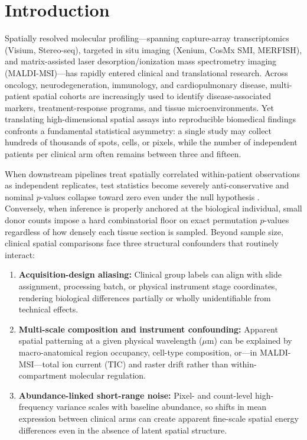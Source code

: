 \documentclass[11pt]{article}
\begin{document}
\section{Introduction}
Spatially resolved molecular profiling---spanning capture-array transcriptomics (Visium, Stereo-seq), targeted in situ imaging (Xenium, CosMx SMI, MERFISH), and matrix-assisted laser desorption/ionization mass spectrometry imaging (MALDI-MSI)---has rapidly entered clinical and translational research. Across oncology, neurodegeneration, immunology, and cardiopulmonary disease, multi-patient spatial cohorts are increasingly used to identify disease-associated markers, treatment-response programs, and tissue microenvironments. Yet translating high-dimensional spatial assays into reproducible biomedical findings confronts a fundamental statistical asymmetry: a single study may collect hundreds of thousands of spots, cells, or pixels, while the number of independent patients per clinical arm often remains between three and fifteen.

When downstream pipelines treat spatially correlated within-patient observations as independent replicates, test statistics become severely anti-conservative and nominal $p$-values collapse toward zero even under the null hypothesis \cite{pseudorep}. Conversely, when inference is properly anchored at the biological individual, small donor counts impose a hard combinatorial floor on exact permutation $p$-values regardless of how densely each tissue section is sampled. Beyond sample size, clinical spatial comparisons face three structural confounders that routinely interact:
\begin{enumerate}
\item \textbf{Acquisition-design aliasing:} Clinical group labels can align with slide assignment, processing batch, or physical instrument stage coordinates, rendering biological differences partially or wholly unidentifiable from technical effects.
\item \textbf{Multi-scale composition and instrument confounding:} Apparent spatial patterning at a given physical wavelength ($\mu\mathrm{m}$) can be explained by macro-anatomical region occupancy, cell-type composition, or---in MALDI-MSI---total ion current (TIC) and raster drift rather than within-compartment molecular regulation.
\item \textbf{Abundance-linked short-range noise:} Pixel- and count-level high-frequency variance scales with baseline abundance, so shifts in mean expression between clinical arms can create apparent fine-scale spatial energy differences even in the absence of latent spatial structure.
\end{enumerate}
\end{document}
